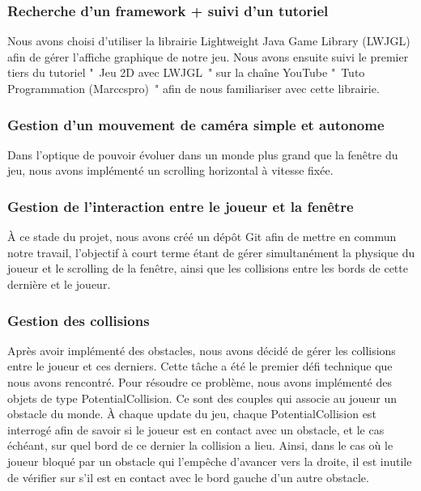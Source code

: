 
\subsubsection{Recherche d'un framework + suivi d'un tutoriel}
Nous avons choisi d'utiliser la librairie Lightweight Java Game Library (LWJGL) afin de gérer l'affiche graphique de notre jeu. Nous avons ensuite suivi le premier tiers du tutoriel " Jeu 2D avec LWJGL " sur la chaîne YouTube " Tuto Programmation (Marccspro) " afin de nous familiariser avec cette librairie.

\subsubsection{Gestion d'un mouvement de caméra simple et autonome}
Dans l'optique de pouvoir évoluer dans un monde plus grand que la fenêtre du jeu, nous avons implémenté un scrolling horizontal à vitesse fixée.

\subsubsection{Gestion de l'interaction entre le joueur et la fenêtre}
À ce stade du projet, nous avons créé un dépôt Git afin de mettre en commun notre travail, l'objectif à court terme étant de gérer simultanément la physique du joueur et le scrolling de la fenêtre, ainsi que les collisions entre les bords de cette dernière et le joueur.

\subsubsection{Gestion des collisions}
Après avoir implémenté des obstacles, nous avons décidé de gérer les collisions entre le joueur et ces derniers. Cette tâche a été le premier défi technique que nous avons rencontré.
\ml
Pour résoudre ce problème, nous avons implémenté des objets de type PotentialCollision.
Ce sont des couples qui associe au joueur un obstacle du monde. À chaque update du jeu, chaque PotentialCollision est interrogé afin de savoir si le joueur est en contact avec un obstacle, et le cas échéant, sur quel bord de ce dernier la collision a lieu.
\ml
Ainsi, dans le cas où le joueur bloqué par un obstacle qui l'empêche d'avancer vers la  droite, il est inutile de vérifier sur s'il est en contact avec le bord gauche d'un autre obstacle.

